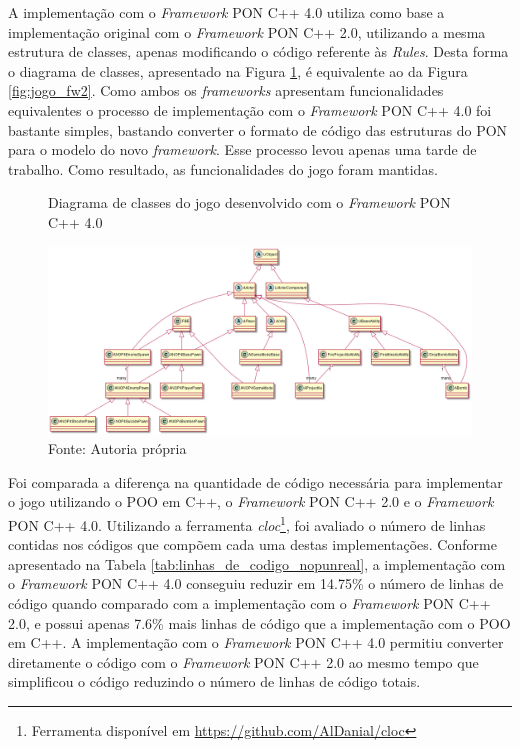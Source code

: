 A implementação com o \textit{Framework} PON C++ 4.0 utiliza
como base a implementação original com o \textit{Framework} PON C++ 2.0,
utilizando a mesma estrutura de classes, apenas modificando o código referente
às \textit{Rules}. Desta forma o diagrama de classes, apresentado na Figura
\ref{fig:jogo_fw4}, é equivalente ao da Figura \ref{fig:jogo_fw2}. 
Como ambos os \textit{frameworks} apresentam funcionalidades equivalentes o
processo de implementação com o \textit{Framework} PON C++ 4.0 foi bastante
simples, bastando converter o formato de código das estruturas do PON para o
modelo do novo \textit{framework}. Esse processo levou apenas uma tarde de
trabalho. Como resultado, as funcionalidades do jogo foram mantidas.

\begin{figure}[!htb]
\centering
\caption{Diagrama de classes do jogo desenvolvido com o \textit{Framework} PON
C++ 4.0 }
\includegraphics[width=\textwidth]{../out/diagrams/class_diagram_nop4/NOP4Unreal.png}
\smallskip
\caption*{Fonte: Autoria própria}
\label{fig:jogo_fw4}
\end{figure}

Foi comparada a diferença na quantidade de código necessária para implementar o
jogo utilizando o POO em C++, o \textit{Framework} PON C++ 2.0 e o
\textit{Framework} PON C++ 4.0. Utilizando a ferramenta
\textit{cloc}\footnote{Ferramenta disponível em
\url{https://github.com/AlDanial/cloc}}, foi avaliado o número de linhas
contidas nos códigos que compõem cada uma destas implementações. Conforme
apresentado na Tabela \ref{tab:linhas_de_codigo_nopunreal}, a implementação com
o \textit{Framework} PON C++ 4.0 conseguiu reduzir em 14.75\% o número de linhas
de código quando comparado com a implementação com o \textit{Framework} PON C++
2.0, e possui apenas 7.6\% mais linhas de código que a implementação com o POO
em C++. A implementação com o \textit{Framework} PON C++ 4.0 permitiu converter
diretamente o código com o \textit{Framework} PON C++ 2.0 ao mesmo tempo que
simplificou o código reduzindo o número de linhas de código totais.

